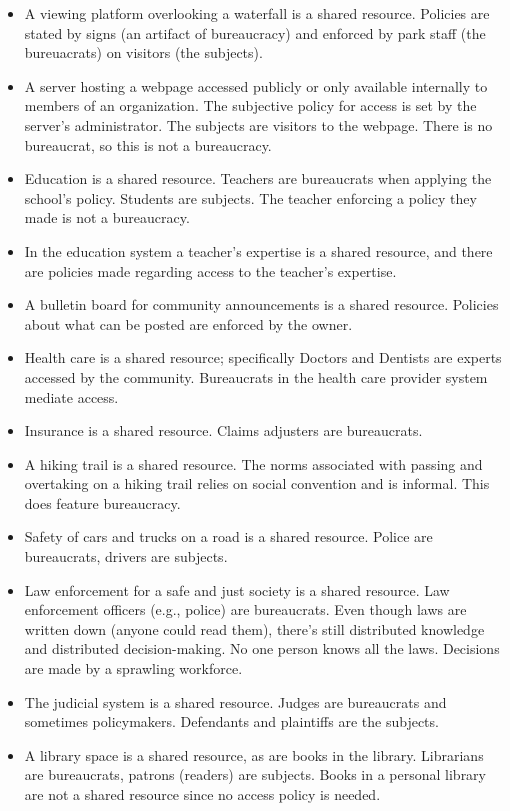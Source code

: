 {{\begin{itemize}
\item A viewing platform overlooking a waterfall is a shared resource. Policies are stated by signs (an artifact of bureaucracy) and enforced by park staff (the bureuacrats) on visitors (the subjects).
\item A server hosting a webpage accessed publicly or only available internally to members of an organization. The subjective policy for access is set by the server's administrator. The subjects are visitors to the webpage. There is no bureaucrat, so this is not a bureaucracy. 
\item Education is a shared resource. Teachers are bureaucrats when applying the school's policy. Students are subjects. The teacher enforcing a policy they made is not a bureaucracy.  
\item In the education system a teacher's expertise is a shared resource, and there are policies made regarding access to the teacher's expertise. 
\item A bulletin board for community announcements is a shared resource. Policies about what can be posted are enforced by the owner.
\item Health care is a shared resource; specifically Doctors and Dentists are experts accessed by the community. Bureaucrats in the health care provider system mediate access.
\item Insurance is a shared resource. Claims adjusters are bureaucrats.
\item A hiking trail is a shared resource. The norms associated with passing and overtaking on a hiking trail
relies on social convention and is informal. This does feature bureaucracy. 
\item Safety of cars and trucks on a road is a shared resource. Police are bureaucrats, drivers are subjects.
\item Law enforcement for a safe and just society is a shared resource. Law enforcement officers (e.g., police) are bureaucrats. 
Even though laws are written down (anyone could read them), there's still distributed knowledge and distributed decision-making. No one person knows all the laws. Decisions are made by a sprawling workforce.
\item The judicial system is a shared resource. Judges are bureaucrats and sometimes policymakers. Defendants and plaintiffs are the subjects. 
\item A library space is a shared resource, as are books in the library. Librarians are bureaucrats, patrons (readers) are subjects. Books in a personal library are not a shared resource since no access policy is needed.

\end{itemize}}}
